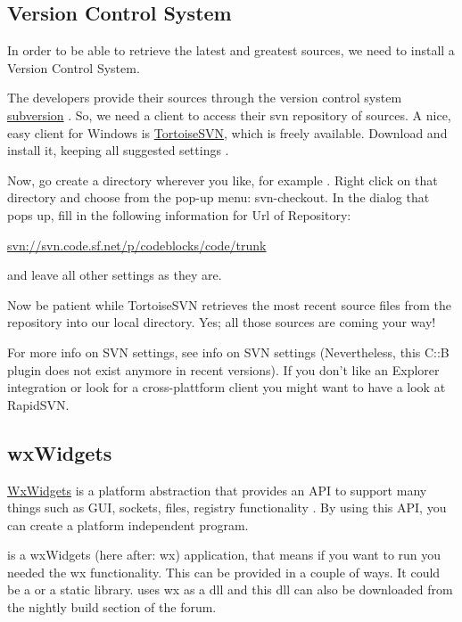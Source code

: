 \subsection{Version Control System}

In order to be able to retrieve the latest and greatest \codeblocks sources, we need to install a Version Control System.

The \codeblocks developers provide their sources through the version control system \href{https://subversion.apache.org/}{subversion} \cite{url:subversion}. So, we need a client to access their svn repository of sources. A nice, easy client for Windows is \href{https://tortoisesvn.net/}{TortoiseSVN}, which is freely available. Download and install it, keeping all suggested settings \cite{url:tortoisesvn}.

Now, go create a directory wherever you like, for example . Right click on that directory and choose from the pop-up menu: svn-checkout. In the dialog that pops up, fill in the following information for Url of Repository:

\url{svn://svn.code.sf.net/p/codeblocks/code/trunk}

and leave all other settings as they are.

Now be patient while TortoiseSVN retrieves the most recent source files from the \codeblocks repository into our local directory. Yes; all those \codeblocks sources are coming your way!

For more info on SVN settings, see info on SVN settings (Nevertheless, this C::B plugin does not exist anymore in recent \codeblocks versions). If you don't like an Explorer integration or look for a cross-plattform client you might want to have a look at RapidSVN.

\subsection{wxWidgets}

\href{https://www.wxwidgets.org/}{WxWidgets} is a platform abstraction that provides an API to support many things such as GUI, sockets, files, registry functionality \cite{url:wx}. By using this API, you can create a platform independent program.

\codeblocks is a wxWidgets (here after: wx) application, that means if you want to run \codeblocks you needed the wx functionality. This can be provided in a couple of ways. It could be a  or a static library. \codeblocks uses wx as a dll and this dll can also be downloaded from the nightly build section of the forum.

